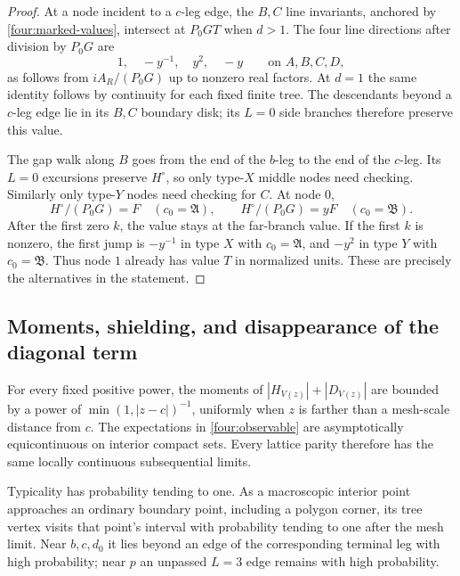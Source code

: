 \begin{proof}
At a node incident to a $c$-leg edge, the $B,C$ line invariants,
anchored by \eqref{four:marked-values}, intersect at $P_0GT$ when $d>1$.
The four line directions after division by $P_0G$ are
\begin{equation}
 1,\quad -y^{-1},\quad y^2,\quad -y
 \qquad\text{on }A,B,C,D,
 \label{four:directions}
\end{equation}
as follows from $iA_R/(P_0G)$ up to nonzero real factors.  At $d=1$
the same identity follows by continuity for each fixed finite tree.
The descendants beyond a $c$-leg edge lie in its $B,C$ boundary disk;
its $L=0$ side branches therefore preserve this value.

The gap walk along $B$ goes from the end of the $b$-leg to the end
of the $c$-leg.  Its $L=0$ excursions preserve $H^\circ$, so only
type-$X$ middle nodes need checking.  Similarly only type-$Y$ nodes
need checking for $C$.  At node $0$,
\begin{equation}
 H^\circ/(P_0G)=F\quad(c_0=\mathfrak A),\qquad
 H^\circ/(P_0G)=yF\quad(c_0=\mathfrak B).
 \label{four:corrected-branch}
\end{equation}
After the first zero $k$, the value stays at the far-branch value.
If the first $k$ is nonzero, the first jump is $-y^{-1}$ in type $X$
with $c_0=\mathfrak A$, and $-y^2$ in type $Y$ with
$c_0=\mathfrak B$.  Thus node $1$ already has value $T$ in normalized
units.  These are precisely the alternatives in the statement.
\end{proof}

\subsection{Moments, shielding, and disappearance of the diagonal term}

\begin{lemma}
\label{four:compactness}
For every fixed positive power, the moments of $|H_{V(z)}|+|D_{V(z)}|$
are bounded by a power of $\min(1,|z-c|)^{-1}$, uniformly when $z$
is farther than a mesh-scale distance from $c$.  The expectations in
\eqref{four:observable} are asymptotically equicontinuous on interior
compact sets.  Every lattice parity therefore has the same locally
continuous subsequential limits.

Typicality has probability tending to one.  As a macroscopic interior
point approaches an ordinary boundary point, including a polygon corner,
its tree vertex visits that point's interval with probability tending to
one after the mesh limit.  Near $b,c,d_0$ it lies beyond an edge of the
corresponding terminal leg with high probability; near $p$ an unpassed
$L=3$ edge remains with high probability.
\end{lemma}

